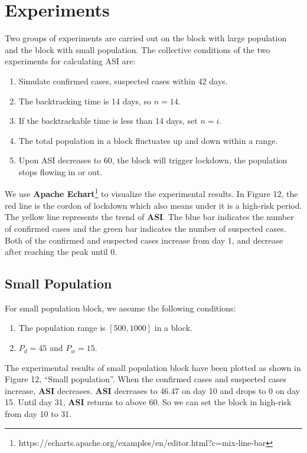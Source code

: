 \documentclass[sigplan,screen]{acmart}
\begin{document}
\section{Experiments}
Two groups of experiments are carried out on the block with large population and the block with small population.
The collective conditions of the two experiments for calculating ASI are:
\begin{enumerate}
	\item Simulate confirmed cases, suspected cases within 42 days.
	\item The backtracking time is 14 days, so $n=14$.
	\item If the backtrackable time is less than 14 days, set $n=i$.
	\item The total population in a block fluctuates up and down within a range.
	\item Upon ASI decreases to 60, the block will trigger lockdown, the population stops flowing in or out.
\end{enumerate}
We use \textbf{Apache Echart}\footnote{https://echarts.apache.org/examples/en/editor.html?c=mix-line-bar} to visualize the experimental results.
In Figure 12, the red line is the cordon of lockdown which also means under it is a high-risk period.
The yellow line represents the trend of \textbf{ASI}.
The blue bar indicates the number of confirmed cases and the green bar indicates the number of suspected cases.
Both of the confirmed and suspected cases increase from day 1, and decrease after reaching the peak until 0.

\subsection{Small Population}
For small population block, we assume the following conditions:
\begin{enumerate}
	\item The population range is $[500,1000]$ in a block.
	\item $P_d=45$ and $P_w=15$.
\end{enumerate}
The experimental results of small population block have been plotted as shown in Figure 12, ``Small population''.
When the confirmed cases and suspected cases increase, \textbf{ASI} decreases.
\textbf{ASI} decreases to $46.47$ on day 10 and drops to $0$ on day 15.
Until day 31, \textbf{ASI} returns to above 60.
So we can set the block in high-risk from day 10 to 31.
\end{document}
